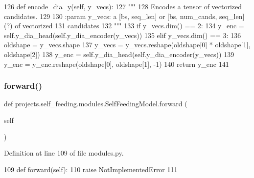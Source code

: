 \begin{DoxyCode}
126     \textcolor{keyword}{def }encode\_dia\_y(self, y\_vecs):
127         \textcolor{stringliteral}{"""}
128 \textcolor{stringliteral}{        Encodes a tensor of vectorized candidates.}
129 \textcolor{stringliteral}{}
130 \textcolor{stringliteral}{        :param y\_vecs: a [bs, seq\_len] or [bs, num\_cands, seq\_len](?) of vectorized}
131 \textcolor{stringliteral}{            candidates}
132 \textcolor{stringliteral}{        """}
133         \textcolor{keywordflow}{if} y\_vecs.dim() == 2:
134             y\_enc = self.y\_dia\_head(self.y\_dia\_encoder(y\_vecs))
135         \textcolor{keywordflow}{elif} y\_vecs.dim() == 3:
136             oldshape = y\_vecs.shape
137             y\_vecs = y\_vecs.reshape(oldshape[0] * oldshape[1], oldshape[2])
138             y\_enc = self.y\_dia\_head(self.y\_dia\_encoder(y\_vecs))
139             y\_enc = y\_enc.reshape(oldshape[0], oldshape[1], -1)
140         \textcolor{keywordflow}{return} y\_enc
141 
\end{DoxyCode}
\mbox{\label{classprojects_1_1self__feeding_1_1modules_1_1SelfFeedingModel_a01b34826a6d6cd308f68d974125de0c5}} 
\subsubsection{\texorpdfstring{forward()}{forward()}}
{\footnotesize\ttfamily def projects.\+self\+\_\+feeding.\+modules.\+Self\+Feeding\+Model.\+forward (\begin{DoxyParamCaption}\item[{}]{self }\end{DoxyParamCaption})}



Definition at line 109 of file modules.\+py.


\begin{DoxyCode}
109     \textcolor{keyword}{def }forward(self):
110         \textcolor{keywordflow}{raise} NotImplementedError
111 
\end{DoxyCode}
\mbox{\label{classprojects_1_1self__feeding_1_1modules_1_1SelfFeedingModel_a027668f97ccbf2fe6dc6fcc2c408218b}} 
